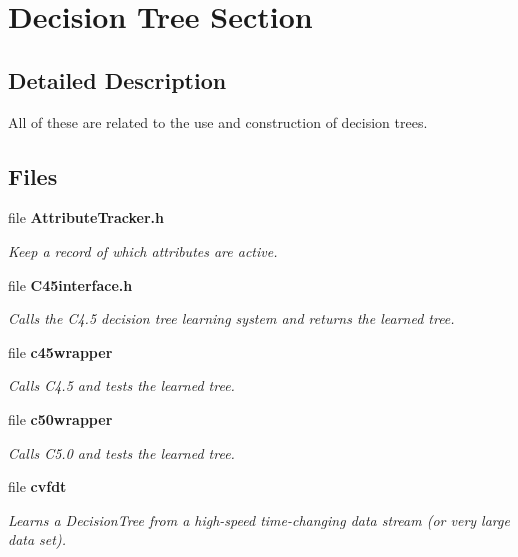 \section{Decision Tree Section}
\label{group__DecisionTree}


\subsection{Detailed Description}
All of these are related to the use and construction of decision trees. 

\subsection*{Files}
\begin{CompactItemize}
\item 
file {\bf Attribute\-Tracker.h}
\begin{CompactList}\small\item\em Keep a record of which attributes are active. \item\end{CompactList}

\item 
file {\bf C45interface.h}
\begin{CompactList}\small\item\em Calls the C4.5 decision tree learning system and returns the learned tree. \item\end{CompactList}

\item 
file {\bf c45wrapper}
\begin{CompactList}\small\item\em Calls C4.5 and tests the learned tree. \item\end{CompactList}

\item 
file {\bf c50wrapper}
\begin{CompactList}\small\item\em Calls C5.0 and tests the learned tree. \item\end{CompactList}

\item 
file {\bf cvfdt}
\begin{CompactList}\small\item\em Learns a Decision\-Tree from a high-speed time-changing data stream (or very large data set). \item\end{CompactList}


\end{CompactItemize}
